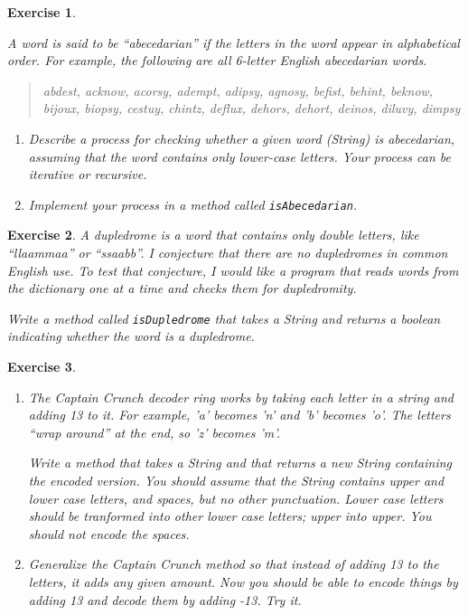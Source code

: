 \documentclass[12pt]{book}
\theoremstyle{exercise}
\newtheorem{exercise}{Exercise}[chapter]
\begin{document}
\begin{exercise}
\label{abecedarian}

A word is said to be ``abecedarian'' if the letters in the
word appear in alphabetical order.  For example, the following
are all 6-letter English abecedarian words.

\begin {quote}
abdest, acknow, acorsy, adempt, adipsy, agnosy, befist, behint,
beknow, bijoux, biopsy, cestuy, chintz, deflux, dehors, dehort,
deinos, diluvy, dimpsy
\end{quote}

\begin{enumerate}

\item Describe a process for checking whether a given word (String)
is abecedarian, assuming that the word contains only lower-case
letters.  Your process can be iterative or recursive.

\item Implement your process in a method called {\tt isAbecedarian}.

\end{enumerate}
\end{exercise}


\begin{exercise}
\label{dupledrome}
A dupledrome is a word that contains only double letters,
like ``llaammaa'' or ``ssaabb''.  I conjecture that there
are no dupledromes in common English use.  To test that
conjecture, I would like a program that reads
words from the dictionary one at a time and checks them for
dupledromity.

Write a method called {\tt isDupledrome} that takes a String
and returns a boolean indicating whether the word is a dupledrome.
\end{exercise}



\begin{exercise}
\begin{enumerate}

\item The Captain Crunch decoder ring works by taking each letter in a
string and adding 13 to it.  For example, 'a' becomes 'n' and 'b'
becomes 'o'.  The letters ``wrap around'' at the end, so 'z' becomes
'm'.

Write a method that takes a String and that returns a new String
containing the encoded version.  You should assume that the String
contains upper and lower case letters, and spaces, but no other
punctuation.  Lower case letters should be tranformed into other lower
case letters; upper into upper.  You should not encode the spaces.

\item Generalize the Captain Crunch method so that instead of adding
13 to the letters, it adds any given amount.  Now you should be able
to encode things by adding 13 and decode them by adding -13.  Try it.

\end{enumerate}
\end{exercise}
\end{document}
